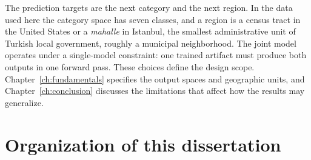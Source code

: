 The prediction targets are the next category and the next region. In the data used
here the category space has seven classes, and a region is a census tract in the United
States or a \emph{mahalle} in Istanbul, the smallest administrative unit of Turkish
local government, roughly a municipal neighborhood.
The joint model operates under a single-model constraint: one trained artifact must produce
both outputs in one forward pass. These choices define the design scope.
Chapter~\ref{ch:fundamentals} specifies the output spaces and geographic units, and
Chapter~\ref{ch:conclusion} discusses the limitations that affect how the results may
generalize.


\section{Organization of this dissertation}
\label{sec:intro:organization}

